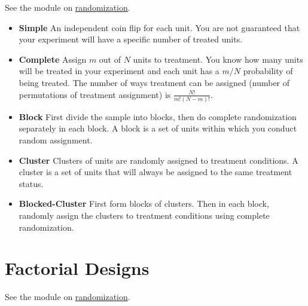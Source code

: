 \documentclass[12pt,]{book}
\providecommand{\tightlist}{%
  \setlength{\itemsep}{0pt}\setlength{\parskip}{0pt}}
\begin{document}
See the module on \href{randomization.html}{randomization}.

\begin{itemize}
\tightlist
\item
  \textbf{Simple} An independent coin flip for each unit. You are not guaranteed
  that your experiment will have a specific number of treated units.
\item
  \textbf{Complete} Assign \(m\) out of \(N\) units to treatment. You know how
  many units will be treated in your experiment and each unit has a \(m/N\)
  probability of being treated. The number of ways treatment can be assigned
  (number of permutations of treatment assignment) is \(\frac{N!}{m!(N-m)!}\).
\item
  \textbf{Block} First divide the sample into blocks, then do complete randomization separately in each block. A block is a set of units within which you conduct random assignment.
\item
  \textbf{Cluster} Clusters of units are randomly assigned to treatment conditions.
  A cluster is a set of units that will always be assigned to the same
  treatment status.
\item
  \textbf{Blocked-Cluster} First form blocks of clusters. Then in each block,
  randomly assign the clusters to treatment conditions using complete
  randomization.
\end{itemize}

\hypertarget{factorial-designs}{%
\section{Factorial Designs}\label{factorial-designs}}

See the module on \href{randomization.html}{randomization}.
\end{document}
